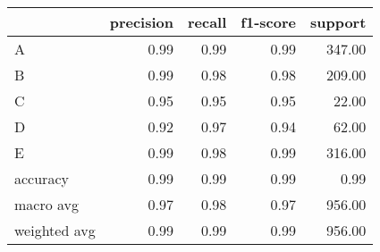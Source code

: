 \begin{tabular}{|l|r|r|r|r|}
\hline
{} &  precision &  recall &  f1-score &  support \\
\hline
A            &       0.99 &    0.99 &      0.99 &   347.00 \\
B            &       0.99 &    0.98 &      0.98 &   209.00 \\
C            &       0.95 &    0.95 &      0.95 &    22.00 \\
D            &       0.92 &    0.97 &      0.94 &    62.00 \\
E            &       0.99 &    0.98 &      0.99 &   316.00 \\
accuracy     &       0.99 &    0.99 &      0.99 &     0.99 \\
macro avg    &       0.97 &    0.98 &      0.97 &   956.00 \\
weighted avg &       0.99 &    0.99 &      0.99 &   956.00 \\
\hline
\end{tabular}
